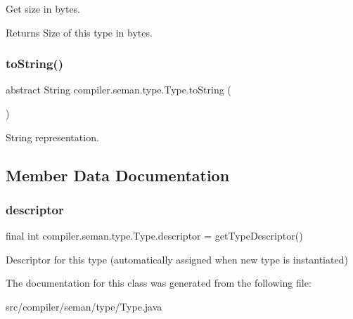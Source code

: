 Get size in bytes.

\begin{DoxyReturn}{Returns}
Size of this type in bytes. 
\end{DoxyReturn}
\mbox{\label{classcompiler_1_1seman_1_1type_1_1_type_a775a220851d5e37349cc93f64f482770}} 
\subsubsection{\texorpdfstring{to\+String()}{toString()}}
{\footnotesize\ttfamily abstract String compiler.\+seman.\+type.\+Type.\+to\+String (\begin{DoxyParamCaption}{ }\end{DoxyParamCaption})\hspace{0.3cm}{\ttfamily [abstract]}}

String representation. 

\subsection{Member Data Documentation}
\mbox{\label{classcompiler_1_1seman_1_1type_1_1_type_afb6b8315f74dcf7fa95df4b4e6fca2e9}} 
\subsubsection{\texorpdfstring{descriptor}{descriptor}}
{\footnotesize\ttfamily final int compiler.\+seman.\+type.\+Type.\+descriptor = get\+Type\+Descriptor()}

Descriptor for this type (automatically assigned when new type is instantiated) 

The documentation for this class was generated from the following file\+:\begin{DoxyCompactItemize}
\item 
src/compiler/seman/type/Type.\+java\end{DoxyCompactItemize}
